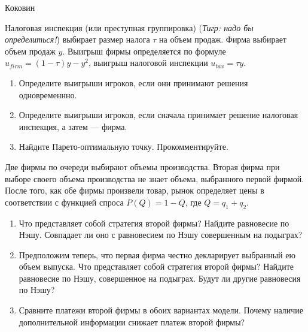 \begin{problem}
\begin{source}
Коковин
\end{source}
Налоговая инспекция (или преступная группировка) ({\it Тигр: надо бы определиться!}) выбирает размер
налога $\tau$ на объем продаж. Фирма выбирает объем продаж $y$.
Выигрыш фирмы определяется по формуле $u_{firm}=(1-\tau)y-y^{2}$,
выигрыш налоговой инспекции $u_{tax}=\tau y$. \par
\begin{enumerate}
\item  Определите выигрыши игроков, если они принимают решения
одновременнно. \par
\item Определите выигрыши игроков, если сначала принимает решение
налоговая инспекция, а затем --- фирма. \par
\item  Найдите Парето-оптимальную точку. Прокомментируйте.
\end{enumerate}


\begin{sol}

\end{sol}
\end{problem}










\begin{problem}
Две фирмы по очереди выбирают объемы производства. Вторая фирма при выборе своего объема производства не знает объема, выбранного первой фирмой. После того, как обе фирмы произвели товар, рынок определяет цены в соответствии с функцией спроса  $P\left(Q\right)=1-Q$, где  $Q=q_{1} +q_{2} $.\par
\begin{enumerate}
\item  Что представляет собой стратегия второй фирмы? Найдите равновесие по Нэшу. Совпадает ли оно с равновесием по Нэшу совершенным на подыграх?\par
\item Предположим теперь, что первая фирма честно декларирует выбранный ею объем выпуска. Что представляет собой стратегия второй фирмы? Найдите равновесие по Нэшу, совершенное на подыграх. Будут ли другие равновесия по Нэшу?\par
\item  Сравните платежи второй фирмы в обоих вариантах модели. Почему наличие дополнительной информации снижает платеж второй фирмы?%
\end{enumerate}


\begin{sol}

\end{sol}
\end{problem}




